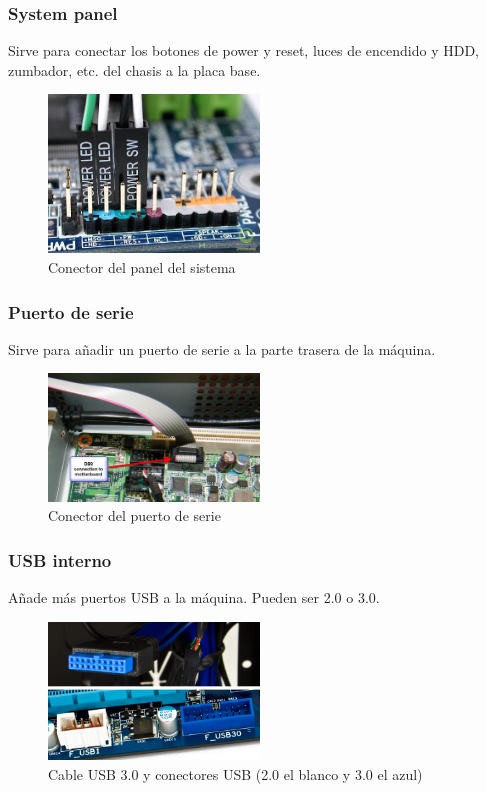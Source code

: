 \documentclass[12pt,spanish]{article}
\begin{document}
\subsubsection{System panel}

Sirve para conectar los botones de power y reset, luces de encendido y HDD, zumbador, etc. del chasis a la placa base.

\begin{figure}[H]
	\centering
	\includegraphics[width=0.5\textwidth]{syspanel.jpg}
	\caption{Conector del panel del sistema}
\end{figure}

\subsubsection{Puerto de serie}

Sirve para añadir un puerto de serie a la parte trasera de la máquina.


\begin{figure}[H]
	\centering
	\includegraphics[width=0.5\textwidth]{serial.jpg}
	\caption{Conector del puerto de serie}
\end{figure}

\subsubsection{USB interno}

Añade más puertos USB a la máquina. Pueden ser 2.0 o 3.0.

\begin{figure}[H]
	\centering
	\includegraphics[width=0.5\textwidth]{mobousb.jpg}
	\caption{Cable USB 3.0 y conectores USB (2.0 el blanco y 3.0 el azul)}
\end{figure}
\end{document}
